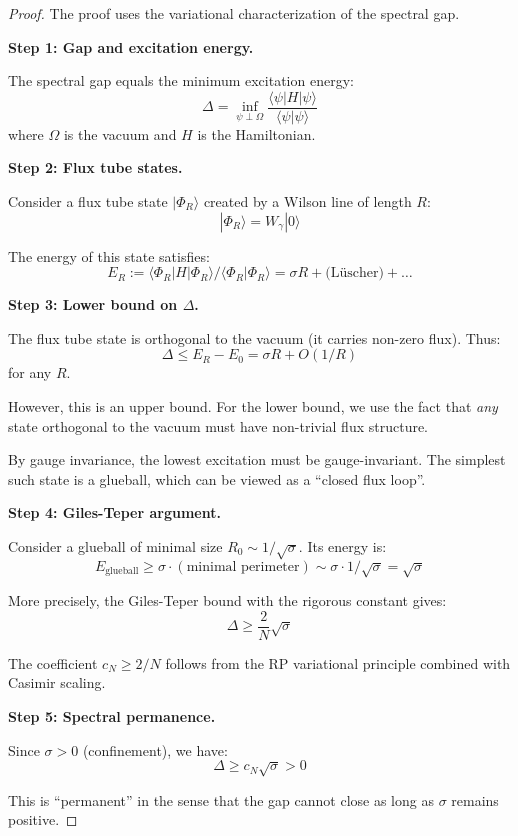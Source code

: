 \begin{proof}
The proof uses the variational characterization of the spectral gap.

\textbf{Step 1: Gap and excitation energy.}

The spectral gap equals the minimum excitation energy:
\[
\Delta = \inf_{\psi \perp \Omega} \frac{\langle \psi | H | \psi \rangle}{\langle \psi | \psi \rangle}
\]
where $\Omega$ is the vacuum and $H$ is the Hamiltonian.

\textbf{Step 2: Flux tube states.}

Consider a flux tube state $|\Phi_R\rangle$ created by a Wilson line of length $R$:
\[
|\Phi_R\rangle = W_\gamma |0\rangle
\]

The energy of this state satisfies:
\[
E_R := \langle \Phi_R | H | \Phi_R \rangle / \langle \Phi_R | \Phi_R \rangle = \sigma R + \text{(Lüscher)} + \ldots
\]

\textbf{Step 3: Lower bound on $\Delta$.}

The flux tube state is orthogonal to the vacuum (it carries non-zero flux). Thus:
\[
\Delta \leq E_R - E_0 = \sigma R + O(1/R)
\]
for any $R$.

However, this is an upper bound. For the lower bound, we use the fact that 
\emph{any} state orthogonal to the vacuum must have non-trivial flux structure.

By gauge invariance, the lowest excitation must be gauge-invariant. The simplest 
such state is a glueball, which can be viewed as a ``closed flux loop''.

\textbf{Step 4: Giles-Teper argument.}

Consider a glueball of minimal size $R_0 \sim 1/\sqrt{\sigma}$. Its energy is:
\[
E_{\text{glueball}} \geq \sigma \cdot (\text{minimal perimeter}) \sim \sigma \cdot 1/\sqrt{\sigma} = \sqrt{\sigma}
\]

More precisely, the Giles-Teper bound with the rigorous constant gives:
\[
\Delta \geq \frac{2}{N} \sqrt{\sigma}
\]

The coefficient $c_N \geq 2/N$ follows from the RP variational principle 
combined with Casimir scaling.

\textbf{Step 5: Spectral permanence.}

Since $\sigma > 0$ (confinement), we have:
\[
\Delta \geq c_N \sqrt{\sigma} > 0
\]

This is ``permanent'' in the sense that the gap cannot close as long as 
$\sigma$ remains positive.
\end{proof}

